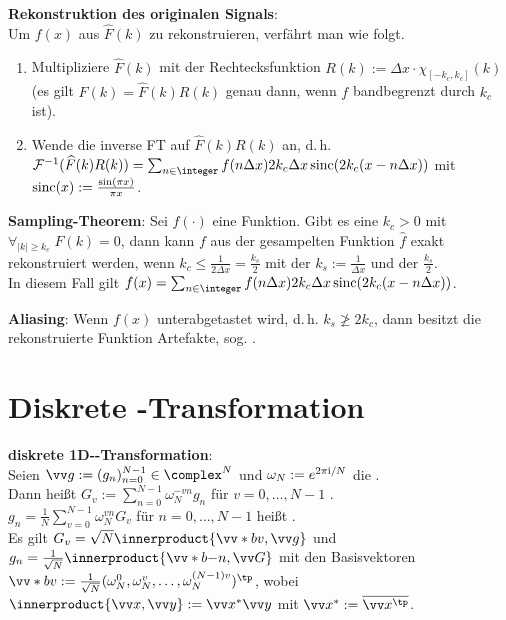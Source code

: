 \textbf{Rekonstruktion des originalen Signals}:\\
Um $f(x)$ aus $\widehat{F}(k)$ zu rekonstruieren, verfährt man wie folgt.
\begin{enumerate}
    \item
    Multipliziere $\widehat{F}(k)$ mit der Rechtecksfunktion
    $R(k) := \Delta x \cdot \chi_{[-k_c,k_c]}(k)$\\
    (es gilt $F(k) = \widehat{F}(k) R(k)$ genau dann, wenn $f$ bandbegrenzt durch $k_c$ ist).

    \item
    Wende die inverse FT auf $\widehat{F}(k) R(k)$ an, d.\,h.\\
    $\F^{-1}(\widehat{F}(k) R(k))
    = \sum_{n \in \integer} f(n\Delta x) 2k_c \Delta x \sinc(2k_c (x - n\Delta x))$
    mit $\operatorname{sinc}(x) := \frac{\sin(\pi x)}{\pi x}$.
\end{enumerate}

\textbf{Sampling-Theorem}:
Sei $f(\cdot)$ eine Funktion.
Gibt es eine  $k_c > 0$ mit\\
$\forall_{|k| \ge k_c}\; F(k) = 0$, dann kann $f$ aus der
gesampelten Funktion $\widehat{f}$ exakt rekonstruiert werden,
wenn $k_c \le \frac{1}{2 \Delta x} = \frac{k_s}{2}$
mit der  $k_s := \frac{1}{\Delta x}$ und
der  $\frac{k_s}{2}$.\\
In diesem Fall gilt
$f(x) = \sum_{n \in \integer} f(n\Delta x) 2k_c \Delta x \sinc(2k_c (x - n\Delta x))$.

\textbf{Aliasing}:
Wenn $f(x)$ unterabgetastet wird, d.\,h. $k_s \not\ge 2k_c$,
dann besitzt die rekonstruierte Funktion Artefakte, sog. .

\section{%
    Diskrete -Transformation%
}

\textbf{diskrete 1D--Transformation}:\\
Seien $\vec{g} := (g_n)_{n=0}^{N-1} \in \complex^N$
und $\omega_N := e^{2\pi\text{i}/N}$ die .\\
Dann heißt
$G_v := \sum_{n=0}^{N-1} \omega_N^{-vn} g_n$ für $v = 0, \dotsc, N - 1$
.\\
$g_n = \frac{1}{N} \sum_{v=0}^{N-1} \omega_N^{vn} G_v$ für $n = 0, \dotsc, N - 1$
heißt .\\
Es gilt $G_v = \sqrt{N} \innerproduct{\vec*{b}{v}, \vec{g}}$
und $g_n = \frac{1}{\sqrt{N}} \innerproduct{\vec*{b}{-n}, \vec{G}}$ mit den Basisvektoren\\
$\vec*{b}{v} := \frac{1}{\sqrt{N}}
(\omega_N^0, \omega_N^{v}, \dotsc, \omega_N^{(N-1)v})^\tp$,
wobei $\innerproduct{\vec{x}, \vec{y}} := \vec{x}^\ast \vec{y}$ mit
$\vec{x}^\ast := \overline{\vec{x}^\tp}$.

